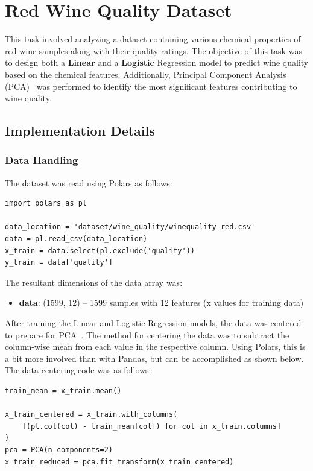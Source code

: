 \newpage
\section{Red Wine Quality Dataset}
This task involved analyzing a dataset containing various chemical properties of red wine samples along with their quality ratings. 
The objective of this task was to design both a \textbf{Linear} and a \textbf{Logistic} Regression model to predict wine quality based on the chemical features. 
Additionally, Principal Component Analysis (PCA)~\cite{wiki_pca} was performed to identify the most significant features contributing to wine quality.


\subsection{Implementation Details}
\subsubsection{Data Handling}
The dataset was read using Polars as follows:
\begin{verbatim}
import polars as pl

data_location = 'dataset/wine_quality/winequality-red.csv'
data = pl.read_csv(data_location)
x_train = data.select(pl.exclude('quality'))
y_train = data['quality']
\end{verbatim}

\noindent The resultant dimensions of the data array was:
\begin{itemize}
    \item \textbf{data}: (1599, 12) -- 1599 samples with 12 features (x values for training data)
\end{itemize}

\noindent After training the Linear and Logistic Regression models, the data was centered to prepare for PCA~\cite{wiki_pca}.
The method for centering the data was to subtract the column-wise mean from each value in the respective column.
Using Polars, this is a bit more involved than with Pandas, but can be accomplished as shown below.
The data centering code was as follows:
\begin{verbatim}
train_mean = x_train.mean()

x_train_centered = x_train.with_columns(
    [(pl.col(col) - train_mean[col]) for col in x_train.columns]
)
pca = PCA(n_components=2)
x_train_reduced = pca.fit_transform(x_train_centered)
\end{verbatim}

